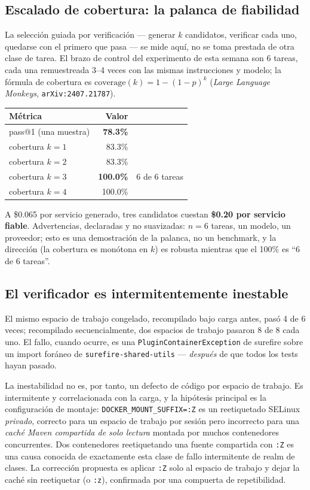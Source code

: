\documentclass[11pt,a4paper]{article}
\begin{document}
\subsection{Escalado de cobertura: la palanca de fiabilidad}

La selección guiada por verificación --- generar $k$ candidatos, verificar cada uno,
quedarse con el primero que pasa --- se mide aquí, no se toma prestada de otra clase de
tarea. El brazo de control del experimento de esta semana son 6 tareas, cada una
remuestreada 3--4 veces con las mismas instrucciones y modelo; la fórmula de cobertura
es $\mathrm{coverage}(k)=1-(1-p)^k$ (\emph{Large Language Monkeys},
\texttt{arXiv:2407.21787}).

\begin{center}
\begin{tabular}{@{}lrl@{}}
\toprule
\textbf{Métrica} & \textbf{Valor} & \\
\midrule
pass@1 (una muestra) & \textbf{78.3\%} & \\
cobertura $k{=}1$ & 83.3\% & \\
cobertura $k{=}2$ & 83.3\% & \\
cobertura $k{=}3$ & \textbf{100.0\%} & 6 de 6 tareas \\
cobertura $k{=}4$ & 100.0\% & \\
\bottomrule
\end{tabular}
\end{center}

A \$0.065 por servicio generado, tres candidatos cuestan \textbf{\$0.20 por servicio
fiable}. Advertencias, declaradas y no suavizadas: $n{=}6$ tareas, un modelo, un
proveedor; esto es una demostración de la palanca, no un benchmark, y la dirección
(la cobertura es monótona en $k$) es robusta mientras que el 100\% es ``6 de 6
tareas''.

\subsection{El verificador es intermitentemente inestable}

El mismo espacio de trabajo congelado, recompilado bajo carga antes, pasó 4 de 6
veces; recompilado secuencialmente, dos espacios de trabajo pasaron 8 de 8 cada uno.
El fallo, cuando ocurre, es una \texttt{PluginContainerException} de surefire sobre un
import foráneo de \texttt{surefire-shared-utils} --- \emph{después} de que todos los
tests hayan pasado.

La inestabilidad no es, por tanto, un defecto de código por espacio de trabajo. Es
intermitente y correlacionada con la carga, y la hipótesis principal es la
configuración de montaje: \texttt{DOCKER\_MOUNT\_SUFFIX=:Z} es un reetiquetado SELinux
\emph{privado}, correcto para un espacio de trabajo por sesión pero incorrecto para
una \emph{caché Maven compartida de solo lectura} montada por muchos contenedores
concurrentes. Dos contenedores reetiquetando una fuente compartida con \texttt{:Z} es
una causa conocida de exactamente esta clase de fallo intermitente de realm de clases.
La corrección propuesta es aplicar \texttt{:Z} solo al espacio de trabajo y dejar la
caché sin reetiquetar (o \texttt{:z}), confirmada por una compuerta de repetibilidad.
\end{document}
